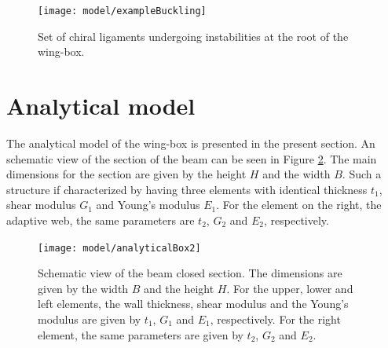   \begin{figure}[!htpb]
    \centering
    \texttt{[image: model/exampleBuckling]}
    \caption[Set of chiral ligaments undergoing instabilities at the root of the wing-box]{Set of chiral ligaments undergoing instabilities at the root of the wing-box.}\label{fig:exampleBuckling}
  \end{figure}


\section{Analytical model} \label{sec:analytical_Model}

  The analytical model of the wing-box is presented in the present section. An schematic view of the section of the beam can be seen in Figure \ref{fig:analyticalBox}. The main dimensions for the section are given by the height $H$ and the width $B$. Such a structure if characterized by having three elements with identical thickness $t_1$, shear modulus $G_1$ and Young's modulus $E_1$. For the element on the right, the adaptive web, the same parameters are $t_2$, $G_2$ and $E_2$, respectively. 

  \begin{figure}[!htpb]
    \centering
    \texttt{[image: model/analyticalBox2]}
    \caption[Schematic view of the beam closed section]{Schematic view of the beam closed section. The dimensions are given by the width $B$ and the height $H$. For the upper, lower and left elements, the wall thickness, shear modulus and the Young's modulus are given by $t_1$, $G_1$ and $E_1$, respectively. For the right element, the same parameters are given by $t_2$, $G_2$ and $E_2$.}\label{fig:analyticalBox}
  \end{figure}

